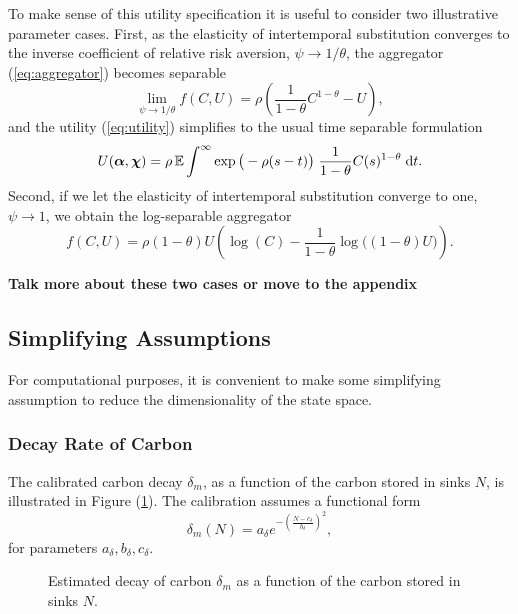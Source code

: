 \documentclass[../../main.tex]{subfiles}
\begin{document}
To make sense of this utility specification it is useful to consider two illustrative parameter cases. First, as the elasticity of intertemporal substitution converges to the inverse  coefficient of relative risk aversion, $\psi \to 1 / \theta$, the aggregator (\ref{eq:aggregator}) becomes separable \begin{equation}
    \lim_{\psi \to 1 / \theta} f(C, U) = \rho \left(\frac{1}{1 - \theta} C^{1 - \theta} - U\right),
\end{equation} and the utility (\ref{eq:utility}) simplifies to the usual time separable formulation \begin{equation}
    U(\bm{\alpha}, \bm{\chi}) = \rho\operatorname{\mathbb{E}} \int^{\infty} \exp\big(-\rho (s - t) \big) \; \frac{1}{1 - \theta} C(s)^{1 - \theta} \; \mathrm{d}t.
\end{equation} Second, if we let the elasticity of intertemporal substitution converge to one, $\psi \to 1$, we obtain the log-separable aggregator \begin{equation} \label{eq:epstein-zin:log-separable}
    f(C, U) = \rho (1 - \theta)U \left(\log(C) - \frac{1}{1 - \theta} \log\big( (1 - \theta) U \big) \right).
\end{equation}

\textbf{Talk more about these two cases or move to the appendix}

\subsection{Simplifying Assumptions}

For computational purposes, it is convenient to make some simplifying assumption to reduce the dimensionality of the state space.

\subsubsection{Decay Rate of Carbon}
 
The calibrated carbon decay $\delta_m$, as a function of the carbon stored in sinks $N$, is illustrated in Figure (\ref{fig:decay}). The calibration assumes a functional form \begin{equation}
    \delta_m(N) = a_{\delta} e^{-\left(\frac{N - c_{\delta}}{b_{\delta}}\right)^2},
\end{equation} for parameters $a_{\delta}, b_{\delta}, c_{\delta}$.

\begin{figure}[H]
    \centering
    \caption{Estimated decay of carbon $\delta_m$ as a  function of the carbon stored in sinks $N$.}
    \label{fig:decay}
\end{figure}
\end{document}
